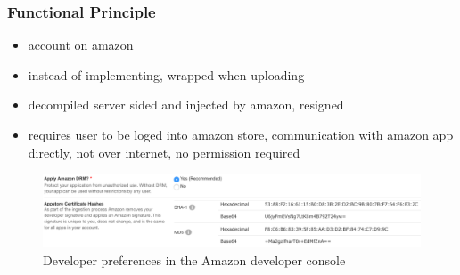 \subsubsection{Functional Principle}\label{section:license-amazon-functional}
\begin{itemize}
  \item account on amazon
  \item instead of implementing, wrapped when uploading
  \item decompiled server sided and injected by amazon, resigned
  \item requires user to be loged into amazon store, communication with amazon app directly, not over internet, no permission required
\end{itemize}
\begin{figure}[h]
    \centering
    \includegraphics[width=1\textwidth]{data/amazon.png}
    \caption{Developer preferences in the Amazon developer console \cite{amazonDeveloper}}
    \label{fig:amazon}
\end{figure}
